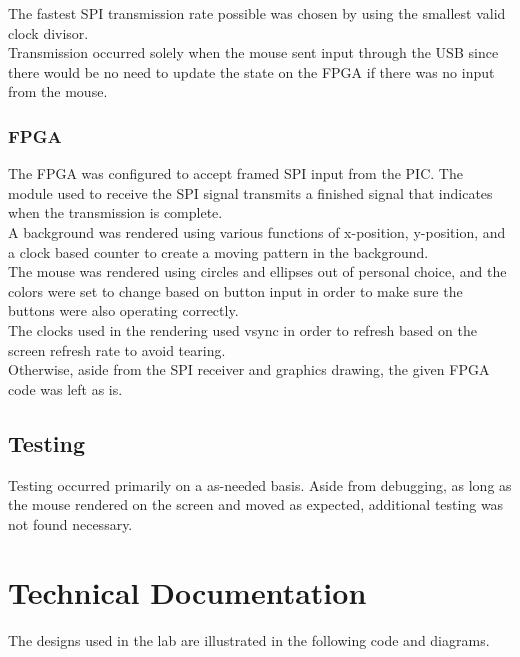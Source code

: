 \documentclass{article}
\begin{document}
The fastest SPI transmission rate possible was chosen by using the smallest valid clock divisor.\\

Transmission occurred solely when the mouse sent input through the USB since there would be no need to update the state on the FPGA if there was no input from the mouse.\\

\subsubsection{FPGA}

The FPGA was configured to accept framed SPI input from the PIC. The module used to receive the SPI signal transmits a finished signal that indicates when the transmission is complete.\\

A background was rendered using various functions of x-position, y-position, and a clock based counter to create a moving pattern in the background.\\

The mouse was rendered using circles and ellipses out of personal choice, and the colors were set to change based on button input in order to make sure the buttons were also operating correctly.\\

The clocks used in the rendering used vsync in order to refresh based on the screen refresh rate to avoid tearing.\\

Otherwise, aside from the SPI receiver and graphics drawing, the given FPGA code was left as is.\\

\subsection{Testing}

Testing occurred primarily on a as-needed basis. Aside from debugging, as long as the mouse rendered on the screen and moved as expected, additional testing was not found necessary.

\section{Technical Documentation}

The designs used in the lab are illustrated in the following code and diagrams.
\end{document}
